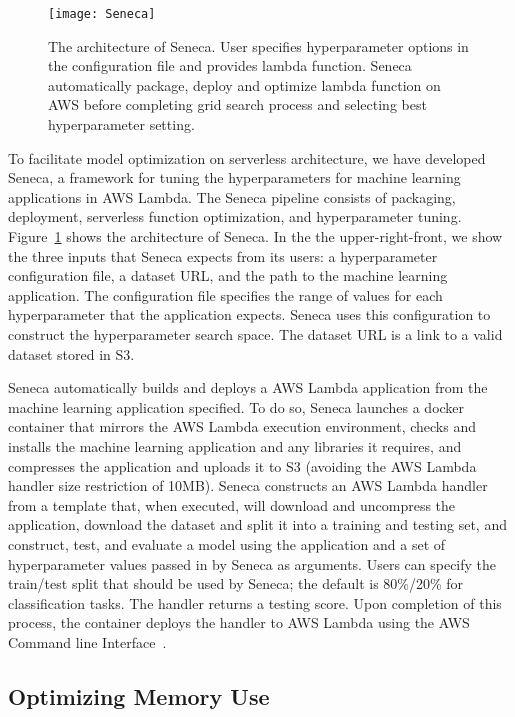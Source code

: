\begin{figure}[t] \centering 
\texttt{[image: Seneca]}
\caption{The architecture of Seneca. 
User specifies hyperparameter options in the configuration file and provides lambda function. Seneca automatically package, deploy and optimize lambda function on AWS before completing grid search process and selecting best hyperparameter setting.
\label{fig:seneca}}
\end{figure}

To facilitate model optimization on serverless architecture, we have developed Seneca, 
a framework for tuning the hyperparameters for machine learning applications 
in AWS Lambda. 
The Seneca pipeline consists of packaging, deployment, serverless 
function optimization, and hyperparameter tuning. Figure~\ref{fig:seneca} 
shows the architecture of Seneca.  In the the upper-right-front, we
show the three inputs that Seneca expects from its users: a hyperparameter
configuration file, a dataset URL, and the path to 
the machine learning application.
The configuration file
specifies the range of values for each hyperparameter that the 
application expects.  Seneca uses this configuration to construct
the hyperparameter search space.  The dataset URL is a link to a
valid dataset stored in S3.  

Seneca automatically builds and deploys a AWS Lambda application
from the machine learning application specified.
To do so, Seneca launches a docker container that mirrors the
AWS Lambda execution environment, checks and installs
the machine learning application and any libraries it requires,
and compresses the application and uploads it to S3 (avoiding
the AWS Lambda handler size restriction of 10MB).
Seneca constructs an AWS Lambda handler from a template
that, when executed, will download and uncompress the application,
download the dataset and split it into a training and testing set,
and construct, test, and evaluate a model using the application
and a set of hyperparameter values passed in by Seneca as arguments.
Users can specify the train/test split that should be used by Seneca; the
default is 80\%/20\% for classification tasks.
The handler returns a testing score. 
Upon completion of this process, the container deploys the handler
to AWS Lambda using the
AWS Command line Interface~\cite{ref:awscli}.



\subsection{Optimizing Memory Use}

